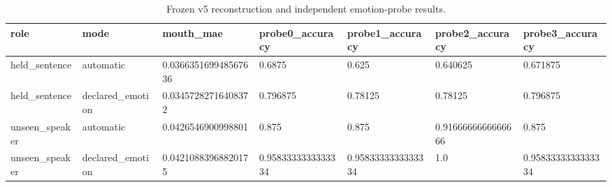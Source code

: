 \begin{table}[t]
\centering
\caption{Frozen v5 reconstruction and independent emotion-probe results.}
\begin{tabular}{lllllll}
\toprule
role & mode & mouth\_mae & probe0\_accuracy & probe1\_accuracy & probe2\_accuracy & probe3\_accuracy \\
\midrule
held\_sentence & automatic & 0.036635169948567636 & 0.6875 & 0.625 & 0.640625 & 0.671875 \\
held\_sentence & declared\_emotion & 0.03457282716408372 & 0.796875 & 0.78125 & 0.78125 & 0.796875 \\
unseen\_speaker & automatic & 0.0426546900998801 & 0.875 & 0.875 & 0.9166666666666666 & 0.875 \\
unseen\_speaker & declared\_emotion & 0.04210883968820175 & 0.9583333333333334 & 0.9583333333333334 & 1.0 & 0.9583333333333334 \\
\bottomrule
\end{tabular}
\end{table}
